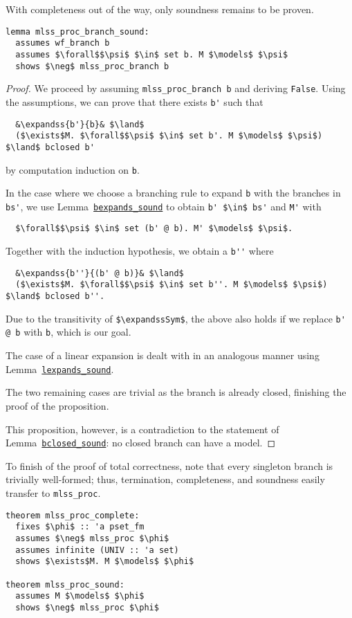 \documentclass[sigplan,10pt,anonymous,review]{acmart}
\newcommand{\lefttriangle}{\mathrel{\tikz[baseline]{\draw (1ex, 0.75ex) -- (0, 1.25ex) -- (0, 0.25ex) -- cycle;}}}
\newcommand{\expandssSym}{\lefttriangle^*}
\newcommand{\expandss}[2]{#1 $\expandssSym$ #2}
\begin{document}
\noindent With completeness out of the way, only soundness remains to be proven. 
\begin{lstlisting}[belowskip=0pt]
lemma mlss_proc_branch_sound:
  assumes wf_branch b
  assumes $\forall$$\psi$ $\in$ set b. M $\models$ $\psi$
  shows $\neg$ mlss_proc_branch b
\end{lstlisting}
\begin{proof}
  We proceed by assuming \lstinline!mlss_proc_branch b! and deriving \lstinline!False!.
  Using the assumptions, we can prove that there exists \lstinline!b'! such that
\begin{lstlisting}
  &\expandss{b'}{b}& $\land$
  ($\exists$M. $\forall$$\psi$ $\in$ set b'. M $\models$ $\psi$) $\land$ bclosed b'
\end{lstlisting}
  by computation induction on \lstinline!b!.

  In the case where we choose a branching rule to expand \lstinline!b! with the branches in \lstinline!bs'!, we use Lemma~\hyperref[lst:lexpands_sound]{\lstinline!bexpands_sound!} to obtain \lstinline!b' $\in$ bs'! and \lstinline!M'! with
\begin{lstlisting}
  $\forall$$\psi$ $\in$ set (b' @ b). M' $\models$ $\psi$.
\end{lstlisting}
  Together with the induction hypothesis, we obtain a \lstinline!b''! where 
\begin{lstlisting}
  &\expandss{b''}{(b' @ b)}& $\land$
  ($\exists$M. $\forall$$\psi$ $\in$ set b''. M $\models$ $\psi$) $\land$ bclosed b''.
\end{lstlisting}
  Due to the transitivity of \lstinline!$\expandssSym$!, the above also holds if we replace \lstinline!b' @ b! with \lstinline!b!, which is our goal.

  The case of a linear expansion is dealt with in an analogous manner using Lemma~\hyperref[lst:lexpands_sound]{\lstinline!lexpands_sound!}.

  The two remaining cases are trivial as the branch is already closed, finishing the proof of the proposition.

  This proposition, however, is a contradiction to the statement of Lemma~\hyperref[lst:bclosed_sound]{\lstinline!bclosed_sound!}: no closed branch can have a model. 
\end{proof}

\noindent To finish of the proof of total correctness, note that every singleton branch is trivially well-formed; thus, termination, completeness, and soundness easily transfer to \lstinline!mlss_proc!.
\begin{lstlisting}
theorem mlss_proc_complete:
  fixes $\phi$ :: 'a pset_fm
  assumes $\neg$ mlss_proc $\phi$
  assumes infinite (UNIV :: 'a set)
  shows $\exists$M. M $\models$ $\phi$

theorem mlss_proc_sound:
  assumes M $\models$ $\phi$
  shows $\neg$ mlss_proc $\phi$
\end{lstlisting}
\end{document}
